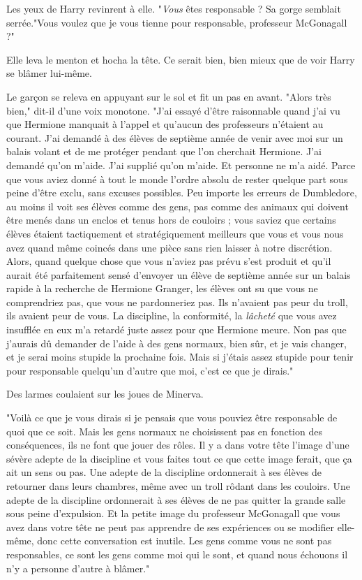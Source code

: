 Les yeux de Harry revinrent à elle. "\emph{Vous}  êtes responsable ? Sa gorge semblait serrée."Vous voulez que je vous tienne pour responsable, professeur McGonagall ?"

Elle leva le menton et hocha la tête. Ce serait bien, bien mieux que de voir Harry se blâmer lui-même.

Le garçon se releva en appuyant sur le sol et fit un pas en avant. "Alors très bien," dit-il d'une voix monotone. "J'ai essayé d'être raisonnable quand j'ai vu que Hermione manquait à l'appel et qu'aucun des professeurs n'étaient au courant. J'ai demandé à des élèves de septième année de venir avec moi sur un balais volant et de me protéger pendant que l'on cherchait Hermione. J'ai demandé qu'on m'aide. J'ai supplié qu'on m'aide. Et personne ne m'a aidé. Parce que vous aviez donné à tout le monde l'ordre absolu de rester quelque part sous peine d'être exclu, sans excuses possibles. Peu importe les erreurs de Dumbledore, au moins il voit ses élèves comme des gens, pas comme des animaux qui doivent être menés dans un enclos et tenus hors de couloirs ; vous saviez que certains élèves étaient tactiquement et stratégiquement meilleurs que vous et vous nous avez quand même coincés dans une pièce sans rien laisser à notre discrétion. Alors, quand quelque chose que vous n'aviez pas prévu s'est produit et qu'il aurait été parfaitement sensé d'envoyer un élève de septième année sur un balais rapide à la recherche de Hermione Granger, les élèves ont su que vous ne comprendriez pas, que vous ne pardonneriez pas. Ils n'avaient pas peur du troll, ils avaient peur de vous. La discipline, la conformité, la \emph{lâcheté}  que vous avez insufflée en eux m'a retardé juste assez pour que Hermione meure. Non pas que j'aurais dû demander de l'aide à des gens normaux, bien sûr, et je vais changer, et je serai moins stupide la prochaine fois. Mais si j'étais assez stupide pour tenir pour responsable quelqu'un d'autre que moi, c'est ce que je dirais."

Des larmes coulaient sur les joues de Minerva.

"Voilà ce que je vous dirais si je pensais que vous pouviez être responsable de quoi que ce soit. Mais les gens normaux ne choisissent pas en fonction des conséquences, ils ne font que jouer des rôles. Il y a dans votre tête l'image d'une sévère adepte de la discipline et vous faites tout ce que cette image ferait, que ça ait un sens ou pas. Une adepte de la discipline ordonnerait à ses élèves de retourner dans leurs chambres, même avec un troll rôdant dans les couloirs. Une adepte de la discipline ordonnerait à ses élèves de ne pas quitter la grande salle sous peine d'expulsion. Et la petite image du professeur McGonagall que vous avez dans votre tête ne peut pas apprendre de ses expériences ou se modifier elle-même, donc cette conversation est inutile. Les gens comme vous ne sont pas responsables, ce sont les gens comme moi qui le sont, et quand nous échouons il n'y a personne d'autre à blâmer."


